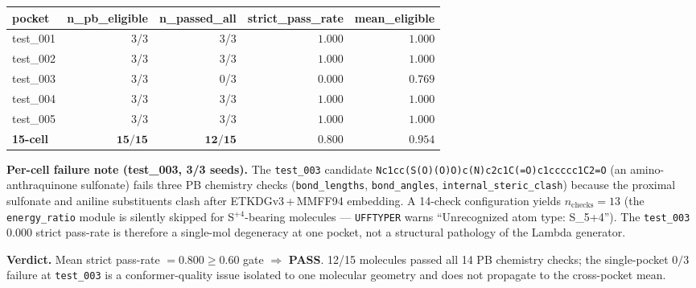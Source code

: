 \begin{center}
\small
\setlength{\tabcolsep}{4pt}
\begin{tabular}{lrrrr}
\toprule
\textbf{pocket} & \textbf{n\_pb\_eligible} & \textbf{n\_passed\_all} & \textbf{strict\_pass\_rate} & \textbf{mean\_eligible} \\
\midrule
test\_001 & 3/3 & 3/3 & $1.000$ & $1.000$ \\
test\_002 & 3/3 & 3/3 & $1.000$ & $1.000$ \\
test\_003 & 3/3 & 0/3 & $0.000$ & $0.769$ \\
test\_004 & 3/3 & 3/3 & $1.000$ & $1.000$ \\
test\_005 & 3/3 & 3/3 & $1.000$ & $1.000$ \\
\midrule
\textbf{15-cell} & $\mathbf{15/15}$ & $\mathbf{12/15}$ & $\mathbf{0.800}$ & $\mathbf{0.954}$ \\
\bottomrule
\end{tabular}
\end{center}

\noindent\textbf{Per-cell failure note (test\_003, 3/3 seeds).}
The \texttt{test\_003} candidate
\texttt{Nc1cc(S(O)(O)O)c(N)c2c1C(=O)c1ccccc1C2=O} (an
amino-anthraquinone sulfonate) fails three PB chemistry checks
(\texttt{bond\_lengths}, \texttt{bond\_angles},
\texttt{internal\_steric\_clash}) because the proximal sulfonate
and aniline substituents clash after ETKDGv3\,+\,MMFF94 embedding.
A 14-check configuration yields $n_{\text{checks}}=13$ (the
\texttt{energy\_ratio} module is silently skipped for
S$^{+4}$-bearing molecules — \texttt{UFFTYPER} warns
``Unrecognized atom type: S\_5+4''). The \texttt{test\_003}
$0.000$ strict pass-rate is therefore a single-mol degeneracy
at one pocket, not a structural pathology of the Lambda
generator.

\noindent\textbf{Verdict.} Mean strict pass-rate $= 0.800 \geq 0.60$
gate $\Rightarrow$ \textbf{PASS}. 12/15 molecules passed all 14 PB
chemistry checks; the single-pocket $0/3$ failure at \texttt{test\_003}
is a conformer-quality issue isolated to one molecular geometry and
does not propagate to the cross-pocket mean.

